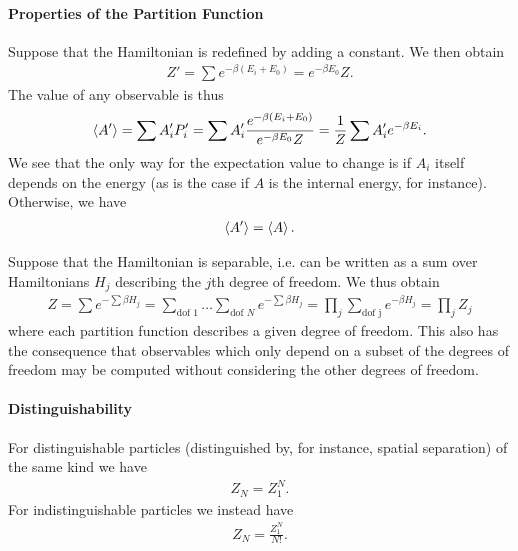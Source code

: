 \paragraph{Properties of the Partition Function}
Suppose that the Hamiltonian is redefined by adding a constant. We then obtain
\begin{align*}
	Z' = \sum e^{-\beta (E_{i} + E_{0})} = e^{-\beta E_{0}}Z.
\end{align*}
The value of any observable is thus
\begin{align*}
	\expval{A'} = \sum A'_{i}P'_{i} = \sum A'_{i}\frac{e^{-\beta(E_{i} + E_{0})}}{e^{-\beta E_{0}}Z} = \frac{1}{Z}\sum A'_{i}e^{-\beta E_{i}}.
\end{align*}
We see that the only way for the expectation value to change is if $A_{i}$ itself depends on the energy (as is the case if $A$ is the internal energy, for instance). Otherwise, we have
\begin{align*}
	\expval{A'} = \expval{A}.
\end{align*}

Suppose that the Hamiltonian is separable, i.e. can be written as a sum over Hamiltonians $H_{j}$ describing the $j$th degree of freedom. We thus obtain
\begin{align*}
	Z = \sum e^{-\sum\beta H_{j}} = \sum\limits_{\text{dof 1}}\dots\sum\limits_{\text{dof }N}e^{-\sum\beta H_{j}} = \prod\limits_{j}\sum\limits_{\text{dof j}}e^{-\beta H_{j}} = \prod\limits_{j}Z_{j}
\end{align*}
where each partition function describes a given degree of freedom. This also has the consequence that observables which only depend on a subset of the degrees of freedom may be computed without considering the other degrees of freedom.

\paragraph{Distinguishability}
For distinguishable particles (distinguished by, for instance, spatial separation) of the same kind we have
\begin{align*}
	Z_{N} = Z_{1}^{N}.
\end{align*}
For indistinguishable particles we instead have
\begin{align*}
	Z_{N} = \frac{Z_{1}^{N}}{N!}.
\end{align*}

